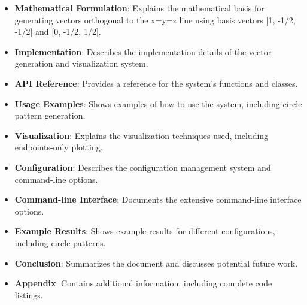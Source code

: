 \begin{itemize}
    \item \textbf{Mathematical Formulation}: Explains the mathematical basis for generating vectors orthogonal to the x=y=z line using basis vectors [1, -1/2, -1/2] and [0, -1/2, 1/2].
    
    \item \textbf{Implementation}: Describes the implementation details of the vector generation and visualization system.
    
    \item \textbf{API Reference}: Provides a reference for the system's functions and classes.
    
    \item \textbf{Usage Examples}: Shows examples of how to use the system, including circle pattern generation.
    
    \item \textbf{Visualization}: Explains the visualization techniques used, including endpoints-only plotting.
    
    \item \textbf{Configuration}: Describes the configuration management system and command-line options.
    
    \item \textbf{Command-line Interface}: Documents the extensive command-line interface options.
    
    \item \textbf{Example Results}: Shows example results for different configurations, including circle patterns.
    
    \item \textbf{Conclusion}: Summarizes the document and discusses potential future work.
    
    \item \textbf{Appendix}: Contains additional information, including complete code listings.
\end{itemize}
